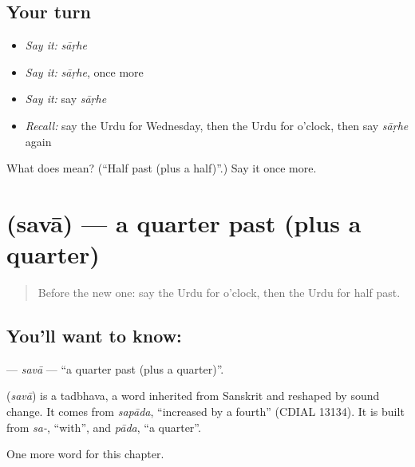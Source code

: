 \subsection*{Your turn}
\begin{itemize}
\raggedright
  \item \emph{Say it:} \emph{sāṛhe}
  \item \emph{Say it:} \emph{sāṛhe}, once more
  \item \emph{Say it:} say \emph{sāṛhe}
  \item \emph{Recall:} say the Urdu for Wednesday, then the Urdu for o'clock, then say \emph{sāṛhe} again
\end{itemize}

\begin{tcolorbox}[breakable,colback=teal!4,colframe=teal!35!black,title={Before you move on}]
What does  mean? (\textquotedblleft{}Half past (plus a half)\textquotedblright{}.) Say it once more.
\end{tcolorbox}
\section[\texorpdfstring{\ur{سوا} (savā)}{سوا (savā)}]{ (savā) — a quarter past (plus a quarter)}

\label{lesson:UR-C92-sava}



\begin{quote}
Before the new one: say the Urdu for o'clock, then the Urdu for half past.
\end{quote}

\subsection*{You'll want to know: }
\textbf{} — \emph{savā} — \textquotedblleft{}a quarter past (plus a quarter)\textquotedblright{}.

\begin{cousinweb}
\textbf{} (\emph{savā}) is a tadbhava, a word inherited from Sanskrit and reshaped by sound change. It comes from \emph{sapāda}, \textquotedblleft{}increased by a fourth\textquotedblright{} (CDIAL 13134). It is built from \emph{sa-}, \textquotedblleft{}with\textquotedblright{}, and \emph{pāda}, \textquotedblleft{}a quarter\textquotedblright{}.
\end{cousinweb}

\begin{grammarlens}[title={What you've built}]
One more word for this chapter.
\end{grammarlens}

